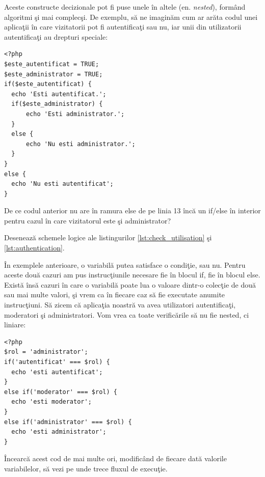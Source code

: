 
Aceste constructe decizionale pot fi puse unele în altele (en. \textsl{nested}),
formând algoritmi şi mai complecşi. De exemplu, să ne imaginăm cum
ar arăta codul unei aplicaţii în care vizitatorii pot fi autentificaţi
sau nu, iar unii din utilizatorii autentificaţi au drepturi speciale:
\begin{lstlisting}[caption={Autentificare}, label=lst:authentication]
<?php
$este_autentificat = TRUE;
$este_administrator = TRUE;
if($este_autentificat) {
  echo 'Esti autentificat.';
  if($este_administrator) {
	  echo 'Esti administrator.';
  }
  else {
	  echo 'Nu esti administrator.';
  }
}
else {
  echo 'Nu esti autentificat';
}
\end{lstlisting}

\begin{Exercise}[title={Întrebare de inteligenţă},difficulty=1]
De ce codul anterior nu are în ramura else de pe linia 13 încă
un if/else în interior pentru cazul în care vizitatorul este
şi administrator?
\end{Exercise}


\begin{Exercise}[title={Schemă logică pornind de la cod PHP},difficulty=1]
Desenează schemele logice ale listingurilor 
\ref{lst:check_utilisation} şi \ref{lst:authentication}.
\end{Exercise}

În exemplele anterioare, o variabilă putea satisface o condiţie, sau nu.
Pentru aceste două cazuri am pus instrucţiunile necesare fie în blocul
{\glqq}if{\grqq}, fie în blocul {\glqq}else{\grqq}.
Există însă cazuri în care o variabilă poate lua o valoare dintr-o colecţie de
două sau mai multe valori, şi vrem ca în fiecare caz să fie
executate anumite instrucţiuni. Să zicem că aplicaţia noastră
va avea utilizatori autentificaţi, moderatori şi administratori.
Vom vrea ca toate verificările să nu fie nested, ci liniare:
\begin{lstlisting}
<?php
$rol = 'administrator';
if('autentificat' === $rol) {
  echo 'esti autentificat';
}
else if('moderator' === $rol) {
  echo 'esti moderator';
}
else if('administrator' === $rol) {
  echo 'esti administrator';
}
\end{lstlisting}
Încearcă acest cod de mai multe ori, modificând de fiecare dată valorile
variabilelor, să vezi pe unde trece fluxul de execuţie.


